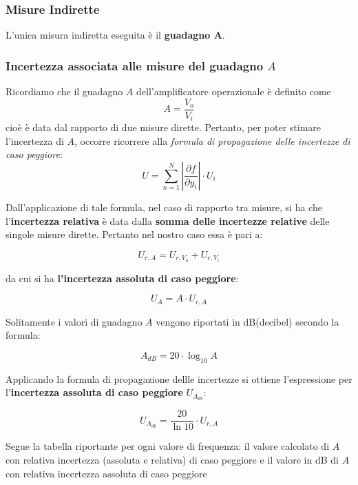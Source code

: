 \clearpage
\subsubsection{Misure Indirette}

L'unica misura indiretta eseguita è il \textbf{guadagno A}.

\subsubsection*{Incertezza associata alle misure del guadagno $A$}

Ricordiamo che il guadagno $A$ dell'amplificatore operazionale è definito come
\[A = \frac{V_o}{V_i}\]
cioè è data dal rapporto di due misure dirette. Pertanto, per poter stimare l'incertezza di $A$, occorre ricorrere alla \textit{formula di propagazione delle incertezze di caso peggiore}:
\[U = \sum_{n=1}^{N} \left|\frac{\partial f}{\partial y_i}\right| \cdot U_i\]

Dall'applicazione di tale formula, nel caso di rapporto tra misure, si ha che l'\textbf{incertezza relativa} è data dalla \textbf{somma delle incertezze relative} delle singole misure dirette. Pertanto nel nostro caso essa è pari a:

\[U_{r,A} = U_{r,V_o} + U_{r,V_i}\]

da cui si ha\textbf{ l'incertezza assoluta di caso peggiore}:

\[U_A = A \cdot U_{r,A}\]

Solitamente i valori di guadagno $A$ vengono riportati in dB(decibel) secondo la formula:

\[A_{dB} = 20\cdot \log_{10} A\]

Applicando la formula di propagazione dellle incertezze si ottiene l'espressione per l'\textbf{incertezza assoluta di caso peggiore} $U_{A_{db}}$:

\[U_{A_{db}} = \frac{20}{\ln 10} \cdot U_{r,A}\]

Segue la tabella riportante per ogni valore di frequenza: il valore calcolato di $A$ con relativa incertezza (assoluta e relativa) di caso peggiore e il valore in dB di $A$ con relativa incertezza assoluta di caso peggiore


